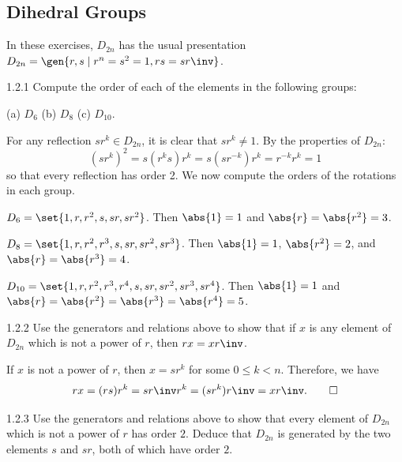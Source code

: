 \subsection{Dihedral Groups}

In these exercises, $D_{2n}$ has the usual presentation 
$D_{2n} = \gen{r, s \mid r^n = s^2 = 1, rs = sr\inv}$.

\begin{exercise}{1.2.1}
    Compute the order of each of the elements in the following groups:

    (a) $D_6$ \quad (b) $D_8$ \quad (c) $D_{10}.$
\end{exercise}

\begin{sol}
    For any reflection $sr^k \in D_{2n}$, it is clear that $sr^k \neq 1$.
	By the properties of $D_{2n}$:
    \[
    	(sr^k)^2 = s(r^ks)r^k = s(sr^{-k})r^k = r^{-k}r^k = 1
    \]
    so that every reflection has order 2.
	We now compute the orders of the rotations in each group.
    \begin{subexercises}
        \item $D_6 = \set{1, r, r^2, s, sr, sr^2}$.
	    Then $\abs{1} = 1$ and $\abs{r} = \abs{r^2} = 3$.
        \item $D_8 = \set{1, r, r^2, r^3, s, sr, sr^2, sr^3}$.
	    Then $\abs{1} = 1$, $\abs{r^2} = 2$, and $\abs{r} = \abs{r^3} = 4$.
        \item $D_{10} = \set{1, r, r^2, r^3, r^4, s, sr, sr^2, sr^3, sr^4}$.
	    Then $\abs{1} = 1$ and $\abs{r} = \abs{r^2} = \abs{r^3} = \abs{r^4} = 5$. \qedhere
    \end{subexercises}
\end{sol}

\begin{exercise}{1.2.2}
    Use the generators and relations above to show that if $x$ is any element of $D_{2n}$ which is not a power of $r$, then $rx = xr\inv$.
\end{exercise}

\begin{sol}
    If $x$ is not a power of $r$, then $x = sr^k$ for some $0 \leq k < n$.
	Therefore, we have
    \[
    	rx = (rs)r^k = s r\inv r^k = (s r^k) r\inv = x r\inv. \qedhere
    \]
\end{sol}

\begin{exercise}{1.2.3}
    Use the generators and relations above to show that every element of $D_{2n}$ which is not a power of $r$ has order $2$.
	Deduce that $D_{2n}$ is generated by the two elements $s$ and $sr$, both of which have order $2$.
\end{exercise}
 
